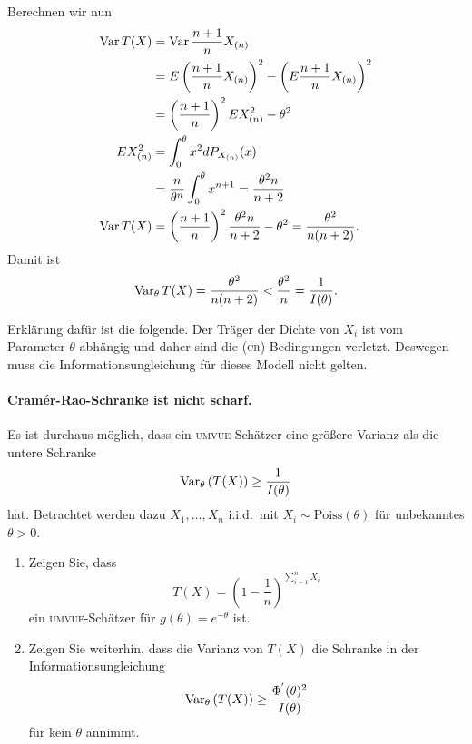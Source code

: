 Berechnen wir nun
\begin{align*}
    \operatorname{Var} T(X) &= \operatorname{Var} \frac{n+1}{n} X_{(n)} \\
    &= E\left( \frac{n+1}{n} X_{(n)} \right)^2 - \left( E \frac{n+1}{n} X_{(n)} \right)^2 \\
    &= \left( \frac{n+1}{n} \right)^2 E X_{(n)}^2 - \theta^2 \\
    E X_{(n)}^2 &= \int_{0}^{\theta} x^2 d P_{X_{(n)}}(x) \\
    &= \frac{n}{\theta^n} \int_{0}^{\theta} x^{n+1} = \frac{\theta^2 n}{n+2} \\
    \operatorname{Var} T(X) &= \left( \frac{n+1}{n} \right)^2 \frac{\theta^2 n }{n+2} - \theta^2 = \frac{\theta^2}{n(n+2)}.
\end{align*}
Damit ist 
\begin{equation*}
    \operatorname{Var}_\theta T(X) = \frac{\theta^2}{n(n+2)} < 
    \frac{\theta^2}{n} = \frac{1}{I(\theta)}.
\end{equation*}

Erklärung dafür ist die folgende. Der
Träger der Dichte von $X_i$ ist vom Parameter $\theta$ abhängig und daher sind
die \textsc{(cr)} Bedingungen verletzt.  Deswegen muss die
Informationsungleichung für dieses Modell nicht gelten. 







\paragraph{Cram\'er-Rao-Schranke ist nicht scharf.    } 
Es ist durchaus möglich, dass ein \textsc{umvue}-Schätzer eine größere Varianz als die untere
Schranke
\begin{equation*}
	\operatorname{Var}_\theta \left( T(X) \right) \geq \frac{1}{I(\theta)}
\end{equation*}
hat. Betrachtet werden dazu $X_1,\ldots,X_n$ i.i.d.\ mit $X_i \sim \textrm{Poiss}(\theta)$ für 
unbekanntes $\theta>0$. 
\begin{enumerate}
    \item Zeigen Sie, dass
\begin{equation*}
	T(X) = \left( 1- \frac{1}{n} \right)^{ \sum_{i=1}^{n} X_i}
\end{equation*}
ein \textsc{umvue}-Schätzer für $g(\theta)=e^{-\theta}$ ist.
    \item Zeigen Sie weiterhin, dass die
Varianz von $T(X)$ die Schranke in der Informationsungleichung
\begin{equation*}
	\operatorname{Var}_\theta\left( T(X) \right) \geq \frac{\Phi^{'}(\theta)^2}{I(\theta)}
\end{equation*}
für kein $\theta$ annimmt.
\end{enumerate}


